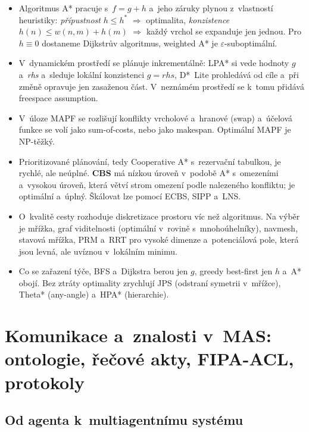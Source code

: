 \documentclass[11pt,a4paper]{article}
\theoremstyle{definition}
\begin{document}
\begin{itemize}
\item Algoritmus A* pracuje s~$f = g+h$ a~jeho záruky plynou z~vlastností heuristiky:
  \emph{přípustnost} $h \le h^*$ $\Rightarrow$ optimalita, \emph{konzistence}
  $h(n) \le w(n,m)+h(m)$ $\Rightarrow$ každý vrchol se expanduje jen jednou. Pro $h\equiv 0$
  dostaneme Dijkstrův algoritmus, weighted A* je $\varepsilon$-suboptimální.
\item V~dynamickém prostředí se plánuje inkrementálně: LPA* si vede hodnoty $g$ a~\emph{rhs}
  a~sleduje lokální konzistenci $g=\mathit{rhs}$, D*~Lite prohledává od cíle a~při změně opravuje
  jen zasaženou část. V~neznámém prostředí se k~tomu přidává freespace assumption.
\item V~úloze MAPF se rozlišují konflikty vrcholové a~hranové (swap) a~účelová funkce se volí
  jako sum-of-costs, nebo jako makespan. Optimální MAPF je NP-těžký.
\item Prioritizované plánování, tedy Cooperative A* s~rezervační tabulkou, je rychlé, ale
  neúplné. \textbf{CBS} má nízkou úroveň v~podobě A* s~omezeními a~vysokou úroveň, která větví
  strom omezení podle nalezeného konfliktu; je optimální a~úplný. Škálovat lze pomocí ECBS,
  SIPP a~LNS.
\item O~kvalitě cesty rozhoduje diskretizace prostoru víc než algoritmus. Na výběr je mřížka,
  graf viditelnosti (optimální v~rovině s~mnohoúhelníky), navmesh, stavová mřížka, PRM a~RRT pro
  vysoké dimenze a~potenciálová pole, která jsou levná, ale uvíznou v~lokálním minimu.
\item Co se zařazení týče, BFS a~Dijkstra berou jen $g$, greedy best-first jen $h$ a~A* obojí.
  Bez ztráty optimality zrychlují JPS (odstraní symetrii v~mřížce), Theta* (any-angle) a~HPA*
  (hierarchie).
\end{itemize}


\section{Komunikace a~znalosti v~MAS: ontologie, řečové akty, FIPA-ACL, protokoly}
\label{sec:komunikace}
\subsection{Od agenta k~multiagentnímu systému}
\end{document}
